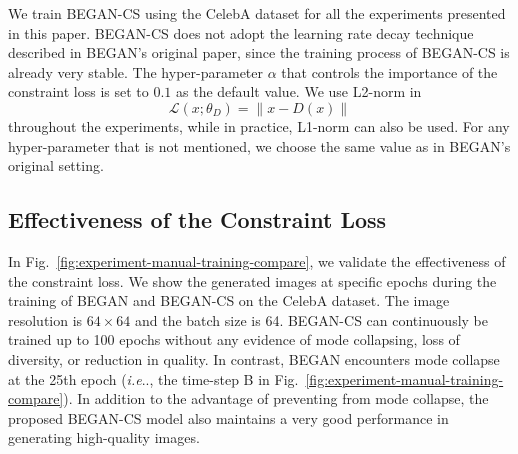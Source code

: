 \documentclass[runningheads]{llncs}
\makeatletter
\DeclareRobustCommand\onedot{\futurelet\@let@token\@onedot}
\def\@onedot{\ifx\@let@token.\else.\null\fi\xspace}
\def\ie{\emph{i.e}\onedot} \def\Ie{\emph{I.e}\onedot}
\makeatother
\begin{document}
    We train BEGAN-CS using the CelebA dataset for all the experiments presented in this paper. BEGAN-CS does not adopt the learning rate decay technique described in BEGAN's original paper, since the training process of BEGAN-CS is already very stable. The hyper-parameter $\alpha$ that controls the importance of the constraint loss is set to $0.1$ as the default value. 
    We use L2-norm in $$\mathcal{L}(x;\theta_D) = \lVert x - D(x) \rVert$$ throughout the experiments, while in practice, L1-norm can also be used.
    For any hyper-parameter that is not mentioned, we choose the same value as in  BEGAN's original setting. 
    
    \subsection{Effectiveness of the Constraint Loss}
    
    In Fig.~\ref{fig:experiment-manual-training-compare}, we validate the effectiveness of the constraint loss. We show the generated images at specific epochs during the training of BEGAN and BEGAN-CS on the CelebA dataset. The image resolution is $64 \times 64$ and the batch size is 64.  BEGAN-CS can continuously be trained up to 100 epochs without any evidence of mode collapsing, loss of diversity, or reduction in quality. In contrast, BEGAN encounters mode collapse at the 25th epoch (\ie, the time-step {\sf B} in Fig.~\ref{fig:experiment-manual-training-compare}). In addition to the advantage of preventing from mode collapse, the proposed BEGAN-CS model also maintains a very good performance in generating high-quality images.
    
    
    
\end{document}
